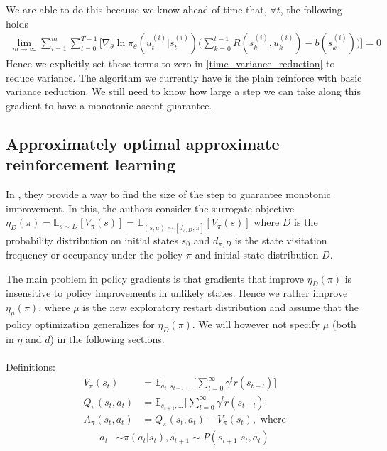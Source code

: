 \documentclass{article}[11pt]
\begin{document}
We are able to do this because we know ahead of time that, $\forall t$, the following holds
\begin{align*}
\lim_{m \to \infty} \sum_{i=1}^m  \sum_{t=0}^{T-1}\Bigg[ \nabla_\theta \ln \pi_\theta(u_{t}^{(i)}|s_{t}^{(i)}) \Big( \sum_{k=0}^{t-1}R(s_k^{(i)}, u_k^{(i)}) - b(s_k^{(i)})\Big)\Bigg] = 0 \ 
\end{align*}
Hence we explicitly set these terms to zero in \ref{time_variance_reduction} to reduce variance. The algorithm we currently have is the plain reinforce \cite{williams1992simple} with basic variance reduction. We still need to know how large a step we can take along this gradient to have a monotonic ascent guarantee. 

\subsection{Approximately optimal approximate reinforcement learning}

In \cite{kakade2002approximately}, they provide a way to find the size of the step to guarantee monotonic improvement. In this, the authors consider the surrogate objective $\eta_D(\pi) = \mathbb{E}_{s \sim D} [V_\pi(s)] =\mathbb{E}_{(s,a) \sim [d_{\pi,D}, \pi] } [V_\pi(s)] $ where $D$ is the probability distribution on initial states $s_0$ and $d_{\pi,D}$ is the state visitation frequency or occupancy under the policy $\pi$ and initial state distribution $D$. 

The main problem in policy gradients is that gradients that improve $\eta_D(\pi)$ is insensitive to policy improvements in unlikely states. Hence we rather improve $\eta_\mu(\pi)$, where $\mu$ is the new exploratory restart distribution and assume that the policy optimization generalizes for $\eta_D(\pi)$. We will however not specify $\mu$ (both in $\eta$ and $d$) in the following sections. \\ \\
Definitions:
\begin{align}
V_\pi(s_t) &= \mathbb{E}_{a_t, s_{t+1}, ...} \Bigg[ \sum_{l=0}^\infty \gamma^l r(s_{t+l})\Bigg]\\
Q_\pi(s_t, a_t) &= \mathbb{E}_{s_{t+1}, ...} \Bigg[ \sum_{l=0}^\infty \gamma^l r(s_{t+l})\Bigg]\\
A_\pi(s_t, a_t) &= Q_\pi(s_t, a_t) - V_\pi(s_t), \text{ where}
\end{align}
\begin{align*}
a_t &\sim \pi(a_t|s_t), s_{t+1} \sim P(s_{t+1}|s_t,a_t) 
\end{align*}
\end{document}
